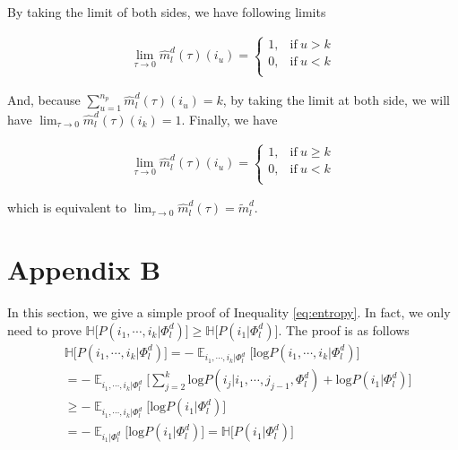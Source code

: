 \documentclass[11pt]{article}
\begin{document}
By taking the limit of both sides, we have following limits

\begin{align*}
\lim_{\tau \rightarrow 0} \hat{m}_l^d(\tau)(i_u) = \begin{cases}
      1, & \text{if}\ u > k \\
      0, & \text{if}\ u < k \\
    \end{cases}
\end{align*}

And, because $ \displaystyle{\mathop{\sum}_{u=1}^{n_p}}\hat{m}_l^d(\tau)(i_u) = k$, by taking the limit at both side, we will have $\lim_{\tau \rightarrow 0} \hat{m}_l^d(\tau)(i_k) = 1$. Finally, we have

\begin{align*}
\lim_{\tau \rightarrow 0} \hat{m}_l^d(\tau)(i_u) = \begin{cases}
      1, & \text{if}\ u \geqslant k \\
      0, & \text{if}\ u < k \\
    \end{cases}
\end{align*}

which is equivalent to $\lim_{\tau \rightarrow 0}\hat{m}_l^d(\tau) = \tilde{m}_l^d$.

\section{Appendix B}
\label{appendix:b}
In this section, we give a simple proof of Inequality \ref{eq:entropy}. In fact, we only need to prove $\mathbb{H} \big[ P(i_1,\cdots,i_k | \Phi_l^d) \big] \geqslant \mathbb{H} \big[ P(i_1 | \Phi_l^d) \big]$. The proof is as follows
\begin{align*}
&\mathbb{H} \big[ P(i_1,\cdots,i_k | \Phi_l^d) \big] = - \displaystyle{\mathop{\mathbb{E}}_{i_1,\cdots,i_k | \Phi_l^d}} \big[ \text{log}P(i_1,\cdots,i_k | \Phi_l^d) \big] \\
&= -\displaystyle{\mathop{\mathbb{E}}_{i_1,\cdots,i_k | \Phi_l^d}} \big[ \displaystyle{\sum_{j=2}^k}\text{log}P(i_j | i_1,\cdots,j_{j-1},\Phi_l^d) +  \text{log} P(i_1 | \Phi_l^d) \big] \\
&\geqslant -\displaystyle{\mathop{\mathbb{E}}_{i_1,\cdots,i_k | \Phi_l^d}} \big[ \text{log} P(i_1 | \Phi_l^d) \big] \\
&= -\displaystyle{\mathop{\mathbb{E}}_{i_1 | \Phi_l^d}} \big[ \text{log} P(i_1 | \Phi_l^d) \big] = \mathbb{H} \big[ P(i_1 | \Phi_l^d) \big]
\end{align*}
\end{document}
